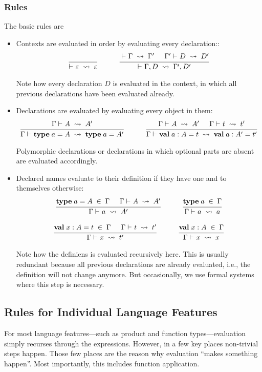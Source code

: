\subsubsection{Rules}

The basic rules are
\begin{itemize}
\item Contexts are evaluated in order by evaluating every declaration::
\[\rul{}{\evcont{}{\epsilon}{\epsilon}}
\tb\tb
\rul{\evcont{}{\Gamma}{\Gamma'} \tb \evdec{}{\Gamma'}{D}{D'}}{\evcont{}{\Gamma,D}{\Gamma',D'}}
\]

Note how every declaration $D$ is evaluated in the context, in which all previous declarations have been evaluated already.

\item Declarations are evaluated by evaluating every object in them:
\[\rul{\evobj{}{\Gamma}{A}{A'}}{\evdec{}{\Gamma}{\atypedef{a}{A}}{\atypedef{a}{A'}}}
\tb\tb
\rul{\evobj{}{\Gamma}{A}{A'}\tb\evobj{}{\Gamma}{t}{t'}}
    {\evdec{}{\Gamma}{\aval{a}{A}{t}}{\aval{a}{A'}{t'}}}\]

Polymorphic declarations or declarations in which optional parts are absent are evaluated accordingly.

\item Declared names evaluate to their definition if they have one and to themselves otherwise:
\[\rul{\atypedef{a}{A}\;\in\; \Gamma \tb \evobj{}{\Gamma}{A}{A'}}
      {\evobj{}{\Gamma}{a}{A'}}
\tb\tb
\rul{\atypedef{a}{}\;\in\; \Gamma}
      {\evobj{}{\Gamma}{a}{a}}
\]

\[\rul{\aval{x}{A}{t}\;\in\; \Gamma \tb \evobj{}{\Gamma}{t}{t'}}
      {\evobj{}{\Gamma}{x}{t'}}
\tb\tb
\rul{\aval{x}{A}{}\;\in\; \Gamma}
      {\evobj{}{\Gamma}{x}{x}}
\]

Note how the definiens is evaluated recursively here.
This is usually redundant because all previous declarations are already evaluated, i.e., the definition will not change anymore.
But occasionally, we use formal systems where this step is necessary.
\end{itemize}

\subsection{Rules for Individual Language Features}

For most language features---such as product and function types---evaluation simply recurses through the expressions.
However, in a few key places non-trivial steps happen.
Those few places are the reason why evaluation ``makes something happen''.
Most importantly, this includes function application.


